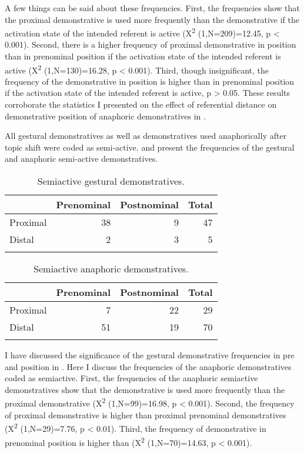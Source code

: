 \documentclass[output=paper,
modfonts
]{langscibook}
\begin{document}
A few things can be said about these frequencies. First, the frequencies show that the proximal demonstrative is used more frequently than the  demonstrative if the activation state of the intended referent is active (X\textsuperscript{2} (1,N=209)=12.45, p < 0.001). Second, there is a higher frequency of proximal demonstrative in  position than in prenominal position if the activation state of the intended referent is active (X\textsuperscript{2} (1,N=130)=16.28, p < 0.001). Third, though insignificant, the frequency of the  demonstrative in  position is higher than in prenominal position if the activation state of the intended referent is active, p > 0.05. These results corroborate the statistics I presented on the effect of referential distance on demonstrative position of anaphoric demonstratives in .

All gestural demonstratives as well as demonstratives used anaphorically after topic shift were coded as semi-active.  and  present the frequencies of the gestural and anaphoric semi-active demonstratives.

\begin{table}
\begin{tabularx}{.66\textwidth}{Xrrr}
\lsptoprule
 & {\bfseries Prenominal} & {\bfseries Postnominal} & {\bfseries Total}\\
\midrule
{ Proximal} & 38 & 9 & 47\\
{ Distal} & 2 & 3 & 5\\
\lspbottomrule
\end{tabularx}

\caption{Semiactive gestural demonstratives.}
\label{tab:mwamzandi:7}
\end{table}

\begin{table}
\begin{tabularx}{.66\textwidth}{Xrrr}
\lsptoprule
 & {\bfseries Prenominal} & {\bfseries Postnominal} & {\bfseries Total}\\
\midrule
{ Proximal} & 7 & 22 & 29\\
{ Distal} & 51 & 19 & 70\\
\lspbottomrule
\end{tabularx}

\caption{Semiactive anaphoric demonstratives.}
\label{tab:mwamzandi:8}
\end{table}

I have discussed the significance of the gestural demonstrative frequencies in pre and  position in . Here I discuss the frequencies of the anaphoric demonstratives coded as semiactive. First, the frequencies of the anaphoric semiactive demonstratives show that the  demonstrative is used more frequently than the proximal demonstrative (X\textsuperscript{2} (1,N=99)=16.98, p < 0.001). Second, the frequency of proximal  demonstrative is higher than proximal prenominal demonstratives (X\textsuperscript{2} (1,N=29)=7.76, p < 0.01). Third, the frequency of  demonstrative in prenominal position is higher than  (X\textsuperscript{2} (1,N=70)=14.63, p < 0.001).
\end{document}
